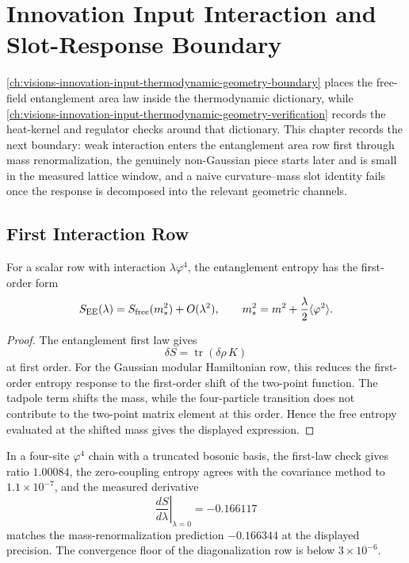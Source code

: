 \chapter{Innovation Input Interaction and Slot-Response Boundary}
\label{ch:visions-innovation-input-interaction-slot-response-boundary}

\autoref{ch:visions-innovation-input-thermodynamic-geometry-boundary}
places the free-field entanglement area law inside the thermodynamic
dictionary, while
\autoref{ch:visions-innovation-input-thermodynamic-geometry-verification}
records the heat-kernel and regulator checks around that dictionary. This
chapter records the next boundary: weak interaction enters the entanglement
area row first through mass renormalization, the genuinely non-Gaussian
piece starts later and is small in the measured lattice window, and a
naive curvature--mass slot identity fails once the response is decomposed
into the relevant geometric channels.

\section{First Interaction Row}
\label{sec:innovation-input-interaction-first-row}

\begin{theorem}
\label{thm:innovation-input-first-interaction-mass-renormalization}
For a scalar row with interaction $\lambda\varphi^4$, the entanglement
entropy has the first-order form
$$
S_{\rm EE}(\lambda)
=
S_{\rm free}(m_*^2)+O(\lambda^2),
\qquad
m_*^2
=
m^2+\frac{\lambda}{2}\langle\varphi^2\rangle.
$$
\end{theorem}

\begin{proof}
The entanglement first law gives
$$
\delta S=\operatorname{tr}(\delta\rho\,K)
$$
at first order. For the Gaussian modular Hamiltonian row, this reduces the
first-order entropy response to the first-order shift of the two-point
function. The tadpole term shifts the mass, while the four-particle
transition does not contribute to the two-point matrix element at this
order. Hence the free entropy evaluated at the shifted mass gives the
displayed expression.
\end{proof}

\begin{principle}
\label{prin:innovation-input-interaction-diagonalization-witness}
In a four-site $\varphi^4$ chain with a truncated bosonic basis, the
first-law check gives ratio $1.00084$, the zero-coupling entropy agrees
with the covariance method to $1.1\times10^{-7}$, and the measured
derivative
$$
\left.\frac{dS}{d\lambda}\right|_{\lambda=0}
=
-0.166117
$$
matches the mass-renormalization prediction $-0.166344$ at the displayed
precision. The convergence floor of the diagonalization row is below
$3\times10^{-6}$.
\end{principle}

